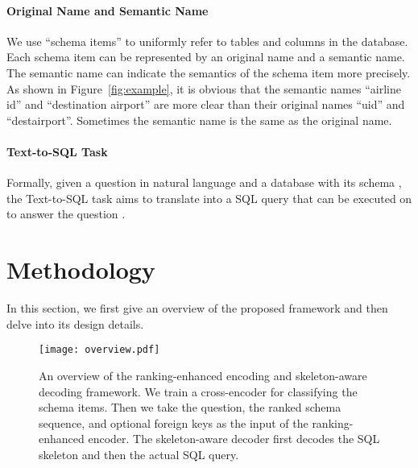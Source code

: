 \documentclass[letterpaper]{article} \usepackage{aaai23}  \usepackage{times}  \usepackage{helvet}  \usepackage{courier}  \usepackage[hyphens]{url}  \usepackage{graphicx} \urlstyle{rm} \def\UrlFont{\rm}  \usepackage{natbib}  \usepackage{caption} \frenchspacing  \setlength{\pdfpagewidth}{8.5in}  \setlength{\pdfpageheight}{11in}  \usepackage{algorithm}
\begin{document}
\paragraph{Original Name and Semantic Name}
We use ``schema items'' to uniformly refer to tables and columns in the database. Each schema item can be represented by an original name and a semantic name. The semantic name can indicate the semantics of the schema item more precisely. As shown in Figure~\ref{fig:example}, it is obvious that the semantic names ``airline id'' and ``destination airport'' are more clear than their original names ``uid'' and ``destairport''. Sometimes the semantic name is the same as the original name.

\paragraph{Text-to-SQL Task}
Formally, given a question  in natural language and a database  with its schema , the Text-to-SQL task aims to translate  into a SQL query  that can be executed on  to answer the question .

\section{Methodology}
In this section, we first give an overview of the proposed framework and then delve into its design details.

\begin{figure*}[t]
    \centering
	\texttt{[image: overview.pdf]}
	\caption{\label{fig:overview} An overview of the ranking-enhanced encoding and skeleton-aware decoding framework. We train a cross-encoder for classifying the schema items. Then we take the question, the ranked schema sequence, and optional foreign keys as the input of the ranking-enhanced encoder. The skeleton-aware decoder first decodes the SQL skeleton and then the actual SQL query.}
\end{figure*}
\end{document}
